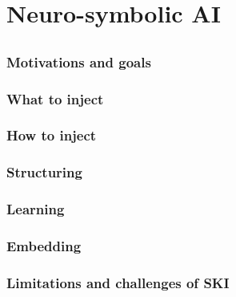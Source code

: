 
\chapter{Neuro-symbolic AI}
\label{ch:nesy-ai}
\mtcaddchapter
\minitoc

\section{}\label{sec:ski}

\subsection{Motivations and goals}\label{subsec:ski-motivations-and-goals}

\subsection{What to inject}\label{subsec:what-to-inject}

\subsection{How to inject}\label{subsec:how-to-inject}

\subsection{Structuring}\label{subsec:structuring}

\subsection{Learning}\label{subsec:learning}

\subsection{Embedding}\label{subsec:ski-embedding}

\subsection{Limitations and challenges of \Gls{SKI}}\label{subsec:limitations-and-challenges-of-ski}

